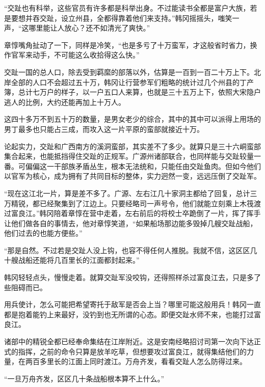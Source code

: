“交趾也有科举，这些官员有许多都是科举出身。不过能读书全都是富户大族，若是要想并吞交趾，设立州县，全都得靠着他们来支持。”韩冈摇摇头，嗤笑一声，“这哪里能让人放心？还不如清光了爽快。”

章惇嘴角扯动了一下，同样是冷笑，“也是多亏了十万蛮军，才这般省时省力，换作官军来动手，不可能这么收拾得这么快。”

交趾一国的总人口，除去受到羁縻的部落以外，估算是一百到一百二十万上下。北岸全部的人口不会超过五十万，韩冈让行营参军们粗略的统计过几个州县的丁产簿，总计七万户的样子，以一户五口人来算，也就是三十五万上下，依照大宋隐户逃人的比例，大约还能再加上十万人。

这四十多万不到五十万的数量，是男女老少的综合，其中的其中可以派得上用场的男丁最多也只能占三成，而攻入这一片平原的蛮部就接近十万。

论起实力，交趾和广西南方的溪洞蛮部，其实差不了多少。就算只是三十六峒蛮部集合起来，也能抵挡得住交趾的正规军。广源州诸部联合，也同样能与交趾较量一番。可偏偏这一干部族矛盾丛生，根本无法统和，只能任由交趾鱼肉。但如今他们以官军为核心，成为拥有了共同目标的整体，实力迥然一变，远远压倒了交趾军。

“现在这江北一片，算是差不多了。广源、左右江几十家洞主都给了回复，总计三万精锐，都已经聚集到了江边上。只要经略司一声号令，他们就能立刻乘上木筏渡过富良江。”韩冈陪着章惇在营中走着，左右前后的将校士卒跪倒了一片，挥了挥手让他们做各自的事情去，他对章惇笑道，“如果船场那边能多毁掉几艘交趾战船，他们过去的也能方便些。”

“那是自然。不过若是交趾人没上钩，也容不得任何人推脱。我就不信，这区区几十艘战船还能将几百里长的江面都封起来。”

韩冈轻轻点头，慢慢走着。就算交趾军没咬钩，还得照样杀过富良江去，只是多了些阻碍而已。

用兵使计，怎么可能把希望寄托于敌军是否会上当？哪里可能这般用兵！韩冈一直都是抱着能钓上来最好，没钓到也无所谓的心态。即便交趾水师不来，也能打过富良江。

诸部中的精锐全都已经奉命集结在江岸附近。这是安南经略招讨司第一次向下达正式的指挥，之前的命令只算是放羊吃草，但想要攻过富良江，就得集结他们的力量，在两百多里长的江面上同时渡江。万舟齐发，看看交趾人怎么防得过来。

“一旦万舟齐发，区区几十条战船根本算不上什么。”

